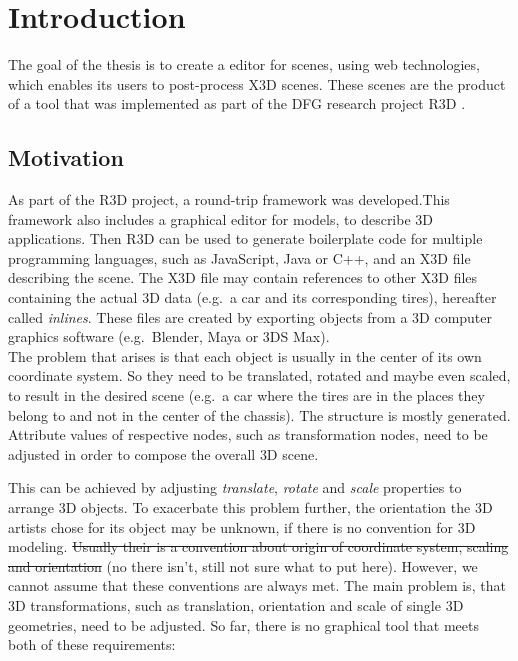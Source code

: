 
\section{Introduction}
\label{sec:Prelude}

The goal of the thesis is to create a editor for  scenes, using web technologies,
which enables its users to post-process \gls{X3D} scenes. These scenes are the
product of a tool that was implemented as part of the DFG research
project \gls{R3D} \cite{Jung:2015:SDA:2802768.2802837}.
\subsection{Motivation}\label{motivation}

As part of the \gls{R3D} project, a round-trip framework
 was developed.This framework also includes a
graphical editor for  models, to describe \gls{3D} applications. Then
\gls{R3D} can be used to generate boilerplate code for multiple programming
languages, such as JavaScript, Java or C++, and an \gls{X3D} file describing
the scene. The \gls{X3D} file may contain references to other \gls{X3D} files
containing the actual \gls{3D} data (e.g.~a car and its corresponding tires),
hereafter called \emph{inlines}. These files are created by exporting
objects from a \gls{3D} computer graphics software (e.g.~Blender,
Maya or 3DS Max).\\
The problem that arises is that each object is usually in the center of
its own coordinate system. So they need to be translated, rotated and
maybe even scaled, to result in the desired scene (e.g.~a car where the tires
are in the places they belong to and not in the center of the chassis).
The structure is mostly generated. Attribute values of respective nodes,
such as transformation nodes, need to be adjusted in order to compose the
overall \gls{3D} scene.


This can be achieved by adjusting \emph{translate}, \emph{rotate} and
\emph{scale} properties to arrange \gls{3D} objects. To exacerbate this problem
further, the orientation the \gls{3D} artists chose for its object may be unknown, if
there is no convention for \gls{3D} modeling. \sout{Usually their is a convention
about origin of coordinate system, scaling and orientation} (no there isn't, still
not sure what to put here). However, we cannot assume that these conventions are
always met. The main problem is, that \gls{3D} transformations, such as translation,
orientation and scale of single \gls{3D} geometries, need to be adjusted. So far,
there is no graphical tool that meets both of these requirements:

